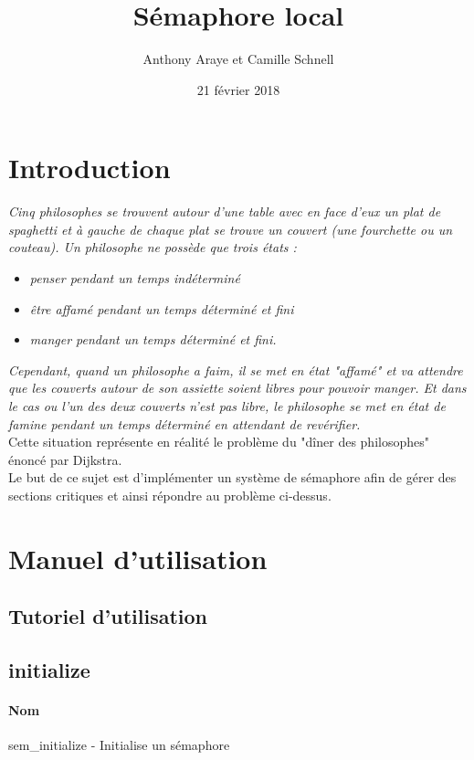 \documentclass[12pt]{article}
\title{Sémaphore local}
\author{Anthony Araye et Camille Schnell}
\date{21 février 2018}
\begin{document}
\maketitle
\renewcommand{\contentsname}{Sommaire}
\tableofcontents
\newpage
\section{Introduction}
    \textit{Cinq philosophes se trouvent autour d'une table avec en face d'eux un plat de spaghetti et à gauche de chaque plat se trouve un couvert (une fourchette ou un couteau).
    Un philosophe ne possède que trois états :}
    \begin{itemize}
        \item \textit{penser pendant un temps indéterminé}
        \item \textit{être affamé pendant un temps déterminé et fini}
        \item \textit{manger pendant un temps déterminé et fini.}
    \end{itemize}

    \textit{Cependant, quand un philosophe a faim, il se met en état "affamé" et va attendre que les couverts autour de son assiette soient libres pour pouvoir manger.
    Et dans le cas ou l'un des deux couverts n'est pas libre, le philosophe se met en état de famine pendant un temps déterminé en attendant de revérifier.}\\
    
    Cette situation représente en réalité le problème du "dîner des philosophes" énoncé par Dijkstra. \\
    
    Le but de ce sujet est d'implémenter un système de sémaphore afin de gérer des sections critiques et ainsi répondre au problème ci-dessus.


\newpage
\section{Manuel d'utilisation}
    \subsection{Tutoriel d'utilisation}
    \newpage
    \subsection{initialize}
        \paragraph{Nom\\}
        sem\_initialize - Initialise un sémaphore
\end{document}
